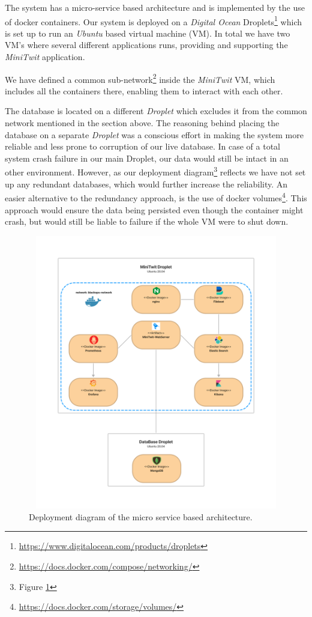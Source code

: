 The system has a micro-service based architecture and is implemented by the use of docker containers. Our system is deployed on a \textit{Digital Ocean} Droplets\footnote{\url{https://www.digitalocean.com/products/droplets}} which is set up to run an \textit{Ubuntu} based virtual machine (VM). In total we have two VM's where several different applications runs, providing and supporting the \textit{MiniTwit} application.

We have defined a common sub-network\footnote{\url{https://docs.docker.com/compose/networking/}} inside the \textit{MiniTwit} VM, which includes all the containers there, enabling them to interact with each other. 

The database is located on a different \textit{Droplet} which excludes it from the common network mentioned in the section above. The reasoning behind placing the database on a separate \textit{Droplet} was a conscious effort in making the system more reliable and less prone to corruption of our live database. In case of a total system crash failure in our main Droplet, our data would still be intact in an other environment. However, as our deployment diagram\footnote{Figure \ref{DeploymentDiagram_1}} reflects we have not set up any redundant databases, which would further increase the reliability. An easier alternative to the redundancy approach, is the use of docker volumes\footnote{\url{https://docs.docker.com/storage/volumes/}}. This approach would ensure the data being persisted even though the container might crash, but would still be liable to failure if the whole VM were to shut down.

\begin{figure}[H]
    \centering
    \includegraphics[width=14cm,height=12cm,keepaspectratio]{Diagrams/DevOpsDeploymentDiagram.png}
    \caption{Deployment diagram of the micro service based architecture.}
    \label{DeploymentDiagram_1}
\end{figure}

